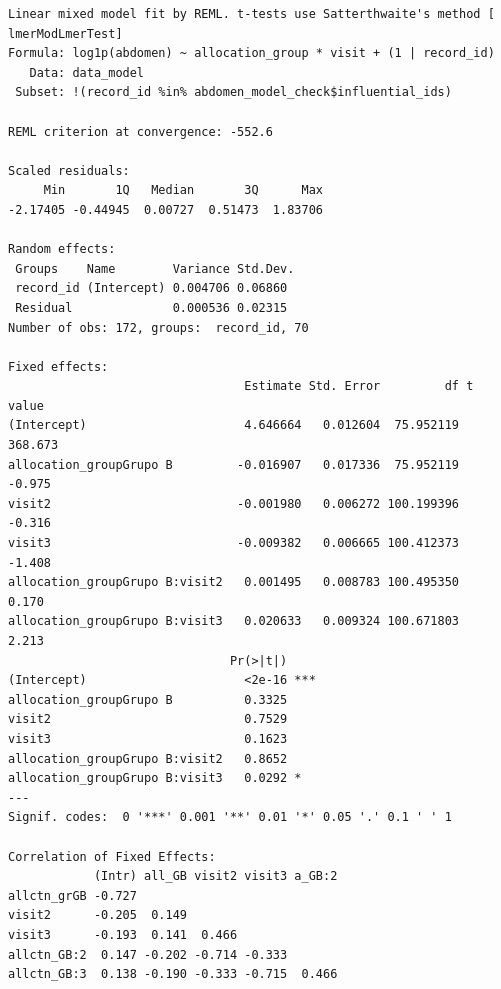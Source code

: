 \documentclass[
  letterpaper,
  DIV=11,
  numbers=noendperiod]{scrartcl}
\newenvironment{Shaded}{\begin{snugshade}}{\end{snugshade}}
\newcommand{\NormalTok}[1]{\textcolor[rgb]{0.00,0.23,0.31}{#1}}
\newcommand{\SpecialCharTok}[1]{\textcolor[rgb]{0.37,0.37,0.37}{#1}}
\begin{document}
\begin{verbatim}
Linear mixed model fit by REML. t-tests use Satterthwaite's method [
lmerModLmerTest]
Formula: log1p(abdomen) ~ allocation_group * visit + (1 | record_id)
   Data: data_model
 Subset: !(record_id %in% abdomen_model_check$influential_ids)

REML criterion at convergence: -552.6

Scaled residuals: 
     Min       1Q   Median       3Q      Max 
-2.17405 -0.44945  0.00727  0.51473  1.83706 

Random effects:
 Groups    Name        Variance Std.Dev.
 record_id (Intercept) 0.004706 0.06860 
 Residual              0.000536 0.02315 
Number of obs: 172, groups:  record_id, 70

Fixed effects:
                                 Estimate Std. Error         df t value
(Intercept)                      4.646664   0.012604  75.952119 368.673
allocation_groupGrupo B         -0.016907   0.017336  75.952119  -0.975
visit2                          -0.001980   0.006272 100.199396  -0.316
visit3                          -0.009382   0.006665 100.412373  -1.408
allocation_groupGrupo B:visit2   0.001495   0.008783 100.495350   0.170
allocation_groupGrupo B:visit3   0.020633   0.009324 100.671803   2.213
                               Pr(>|t|)    
(Intercept)                      <2e-16 ***
allocation_groupGrupo B          0.3325    
visit2                           0.7529    
visit3                           0.1623    
allocation_groupGrupo B:visit2   0.8652    
allocation_groupGrupo B:visit3   0.0292 *  
---
Signif. codes:  0 '***' 0.001 '**' 0.01 '*' 0.05 '.' 0.1 ' ' 1

Correlation of Fixed Effects:
            (Intr) all_GB visit2 visit3 a_GB:2
allctn_grGB -0.727                            
visit2      -0.205  0.149                     
visit3      -0.193  0.141  0.466              
allctn_GB:2  0.147 -0.202 -0.714 -0.333       
allctn_GB:3  0.138 -0.190 -0.333 -0.715  0.466
\end{verbatim}

\begin{Shaded}
\end{Shaded}
\end{document}
